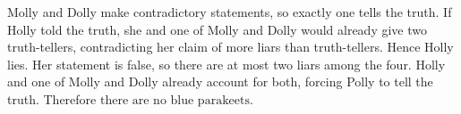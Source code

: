 Molly and Dolly make contradictory statements, so exactly one tells the truth. If Holly told the truth, she and one of Molly and Dolly would already give two truth-tellers, contradicting her claim of more liars than truth-tellers. Hence Holly lies. Her statement is false, so there are at most two liars among the four. Holly and one of Molly and Dolly already account for both, forcing Polly to tell the truth. Therefore $\boxed{\text{there are no blue parakeets}}$.
